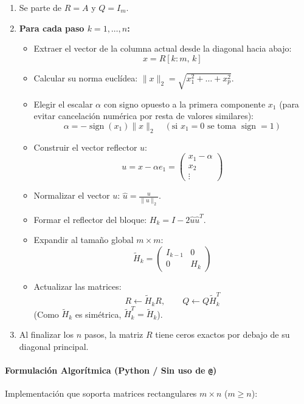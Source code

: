 \documentclass[11pt,a4paper]{article}
\begin{document}
\begin{enumerate}
    \item Se parte de $R = A$ y $Q = I_m$.
    \item \textbf{Para cada paso $k = 1, \dots, n$:}
    \begin{itemize}
        \item Extraer el vector de la columna actual desde la diagonal hacia abajo:
        \[
        x = R[k:m, \, k]
        \]
        \item Calcular su norma euclídea: $\|x\|_2 = \sqrt{x_1^2 + \dots + x_p^2}$.
        \item Elegir el escalar $\alpha$ con signo opuesto a la primera componente $x_1$ (para evitar cancelación numérica por resta de valores similares):
        \[
        \alpha = -\operatorname{sign}(x_1) \|x\|_2 \quad (\text{si } x_1 = 0 \text{ se toma } \operatorname{sign}=1)
        \]
        \item Construir el vector reflector $u$:
        \[
        u = x - \alpha e_1 = \begin{pmatrix} x_1 - \alpha \\ x_2 \\ \vdots \end{pmatrix}
        \]
        \item Normalizar el vector $u$: $\hat{u} = \frac{u}{\|u\|_2}$.
        \item Formar el reflector del bloque: $H_k = I - 2 \hat{u} \hat{u}^T$.
        \item Expandir al tamaño global $m \times m$:
        \[
        \tilde{H}_k = \begin{pmatrix} I_{k-1} & 0 \\ 0 & H_k \end{pmatrix}
        \]
        \item Actualizar las matrices:
        \[
        R \leftarrow \tilde{H}_k R, \qquad Q \leftarrow Q \tilde{H}_k^T
        \]
        (Como $\tilde{H}_k$ es simétrica, $\tilde{H}_k^T = \tilde{H}_k$).
    \end{itemize}
    \item Al finalizar los $n$ pasos, la matriz $R$ tiene ceros exactos por debajo de su diagonal principal.
\end{enumerate}

\paragraph{Formulación Algorítmica (Python / Sin uso de \texttt{@})}
Implementación que soporta matrices rectangulares $m \times n$ ($m \ge n$):
\end{document}
